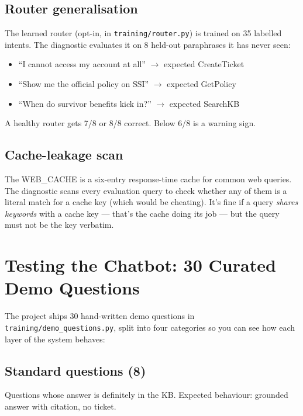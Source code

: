 \documentclass[11pt,a4paper]{article}
\begin{document}
\subsection{Router generalisation}

The learned router (opt-in, in \texttt{training/router.py}) is trained on 35 labelled intents. The diagnostic evaluates it on 8 held-out paraphrases it has never seen:

\begin{itemize}[leftmargin=*, itemsep=0.5pt]
\item ``I cannot access my account at all'' $\rightarrow$ expected CreateTicket
\item ``Show me the official policy on SSI'' $\rightarrow$ expected GetPolicy
\item ``When do survivor benefits kick in?'' $\rightarrow$ expected SearchKB
\end{itemize}

A healthy router gets 7/8 or 8/8 correct. Below 6/8 is a warning sign.

\subsection{Cache-leakage scan}

The WEB\_CACHE is a six-entry response-time cache for common web queries. The diagnostic scans every evaluation query to check whether any of them is a literal match for a cache key (which would be cheating). It's fine if a query \emph{shares keywords} with a cache key --- that's the cache doing its job --- but the query must not be the key verbatim.

\clearpage
\section{Testing the Chatbot: 30 Curated Demo Questions}

The project ships 30 hand-written demo questions in \texttt{training/demo\_questions.py}, split into four categories so you can see how each layer of the system behaves:

\subsection{Standard questions (8)}

Questions whose answer is definitely in the KB. Expected behaviour: grounded answer with citation, no ticket.
\end{document}
